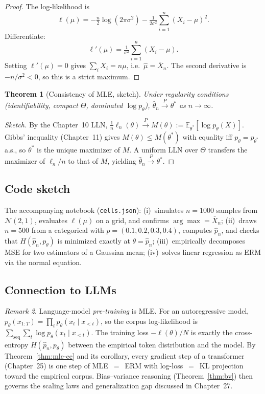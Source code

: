 \documentclass[11pt]{article}
\newtheorem{theorem}{Theorem}[section]
\theoremstyle{remark}
\newtheorem{remark}[theorem]{Remark}
\begin{document}
\begin{proof}
The log-likelihood is
\[
\ell(\mu) = -\tfrac{n}{2}\log(2\pi\sigma^2) - \tfrac{1}{2\sigma^2}\sum_{i=1}^n (X_i-\mu)^2.
\]
Differentiate:
\[
\ell'(\mu) = \tfrac{1}{\sigma^2}\sum_{i=1}^n (X_i - \mu).
\]
Setting $\ell'(\mu)=0$ gives $\sum_i X_i = n\mu$, i.e.\ $\hat\mu = \bar X_n$. The second derivative is $-n/\sigma^2 < 0$, so this is a strict maximum.
\end{proof}

\begin{theorem}[Consistency of MLE, sketch]\label{thm:consistency}
Under regularity conditions (identifiability, compact $\Theta$, dominated $\log p_\theta$), $\hat\theta_n \xrightarrow{P} \theta^*$ as $n \to \infty$.
\end{theorem}

\begin{proof}[Sketch]
By the Chapter~10 LLN, $\tfrac{1}{n}\ell_n(\theta) \xrightarrow{P} M(\theta) := \mathbb{E}_{\theta^*}[\log p_\theta(X)]$. Gibbs' inequality (Chapter~11) gives $M(\theta) \le M(\theta^*)$ with equality iff $p_\theta = p_{\theta^*}$ a.s., so $\theta^*$ is the unique maximizer of $M$. A uniform LLN over $\Theta$ transfers the maximizer of $\ell_n/n$ to that of $M$, yielding $\hat\theta_n \xrightarrow{P} \theta^*$.
\end{proof}

\subsection*{Code sketch}

The accompanying notebook (\texttt{cells.json}): (i)~simulates $n=1000$ samples from $\mathcal{N}(2,1)$, evaluates $\ell(\mu)$ on a grid, and confirms $\arg\max = \bar X_n$; (ii)~draws $n=500$ from a categorical with $p=(0.1,0.2,0.3,0.4)$, computes $\hat p_n$, and checks that $H(\hat p_n,p_\theta)$ is minimized exactly at $\theta = \hat p_n$; (iii)~empirically decomposes MSE for two estimators of a Gaussian mean; (iv)~solves linear regression as ERM via the normal equation.

\subsection*{Connection to LLMs}

\begin{remark}
Language-model \emph{pre-training} is MLE. For an autoregressive model, $p_\theta(x_{1:T}) = \prod_{t} p_\theta(x_t \mid x_{<t})$, so the corpus log-likelihood is $\sum_{\mathrm{seq}}\sum_t \log p_\theta(x_t\mid x_{<t})$. The training loss $-\ell(\theta)/N$ is exactly the cross-entropy $H(\hat p_n, p_\theta)$ between the empirical token distribution and the model. By Theorem~\ref{thm:mle-ce} and its corollary, every gradient step of a transformer (Chapter~25) is one step of MLE~$=$~ERM with log-loss~$=$~KL projection toward the empirical corpus. Bias--variance reasoning (Theorem~\ref{thm:bv}) then governs the scaling laws and generalization gap discussed in Chapter~27.
\end{remark}
\end{document}

